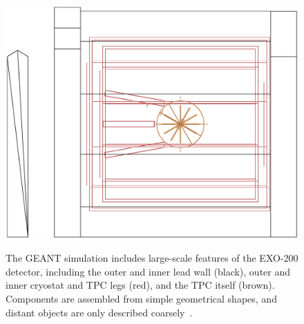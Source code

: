\begin{figure}
\begin{center}
\includegraphics[keepaspectratio=true,width=\textwidth]{OGL_wireframe.eps}
\end{center}
\renewcommand{\baselinestretch}{1}
\small\normalsize
\begin{quote}
\caption{The GEANT simulation includes large-scale features of the EXO-200 detector, including the outer and inner lead wall (black), outer and inner cryostat and TPC legs (red), and the TPC itself (brown).  Components are assembled from simple geometrical shapes, and distant objects are only described coarsely~\cite{MCDocumentRun2a}.}
\label{fig:OGL_wireframevis}
\end{quote}
\end{figure}
\renewcommand{\baselinestretch}{2}
\small\normalsize

